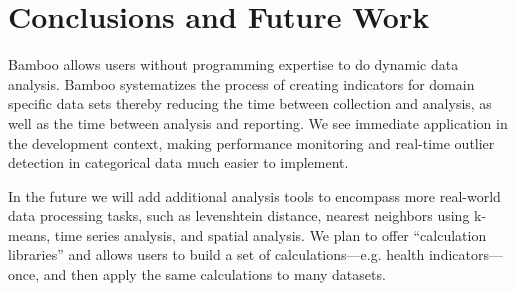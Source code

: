 \documentclass{acm_proc_article-sp}
\begin{document}

%
%

\section{Conclusions and Future Work}
Bamboo allows users without programming expertise to do dynamic data analysis.  Bamboo systematizes the process of creating indicators for domain specific data sets thereby reducing the time between collection and analysis, as well as the time between analysis and reporting.
We see immediate application in the development context, making performance monitoring \cite{berg} and real-time outlier detection in categorical data \cite{dimagi} much easier to implement. 

In the future we will add additional analysis tools to encompass more real-world data processing tasks, such as levenshtein distance, nearest neighbors using k-means, time series analysis, and spatial analysis.  We plan to offer ``calculation libraries'' and allows users to build a set of calculations---e.g. health indicators---once, and then apply the same calculations to many datasets.


%

%
%

\balancecolumns
\end{document}
